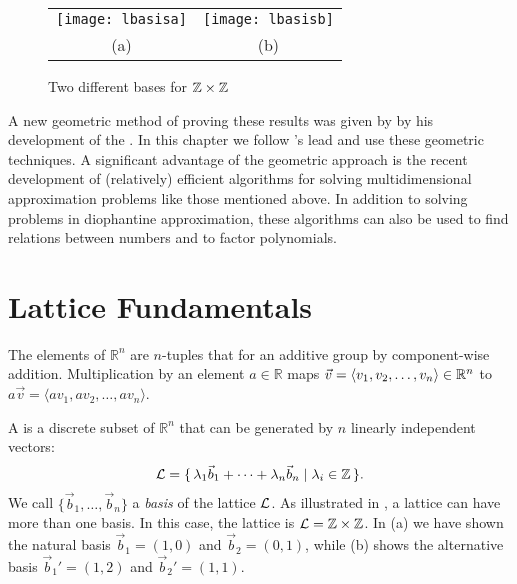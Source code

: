 \begin{figure}
\begin{center}\tabcolsep=2pc
 \begin{tabular}{cc}
  \texttt{[image: lbasisa]} 
   &
  \texttt{[image: lbasisb]} \\
  (a) & (b)
 \end{tabular}
\end{center}
\caption{Two different bases for ${\protect\mathbb{Z}} \times {\protect\mathbb{Z}}$
     \label{Lattice:Basis:Fig}}
\end{figure}

A new geometric method of proving these results was given by {\Minkowski}
by his development of the .  In this chapter
we follow {\Minkowski}'s lead and use these geometric techniques.  A
significant advantage of the geometric approach is the recent
development of (relatively) efficient algorithms for solving
multidimensional approximation problems like those mentioned above.
In addition to solving problems in diophantine approximation, these
algorithms can also be used to find relations between numbers and to
factor polynomials. 

\section{Lattice Fundamentals}
\label{Lattice:Fund:Sec}

The elements of $\mathbb{R}^{n}$ are $n$-tuples that for an additive group by 
component-wise addition. Multiplication by an element $a \in \mathbb{R}$ 
maps $\vec v = \langle v_1, v_2, \ldots, v_n \rangle \in \mathbb{R}^n$ to 
$a \vec v = \langle av_1, av_2, \ldots, a v_n \rangle$.

A  is a discrete subset of $\mathbb{R}^{n}$ that 
can be generated by $n$ linearly independent vectors: 
\begin{equation*}
{\cal L} = \{\, \lambda_{1} \vec b_{1} + \cdots + \lambda_{n} \vec b_{n} \mid
\lambda_{i} \in \mathbb{Z} \,\}.
\end{equation*}
We call $\{\vec b_{1}, \ldots, \vec b_{n}\}$ a {\em
basis} of the lattice ${\cal L}$.  As illustrated
in , a lattice can have more than one basis.
In this case, the lattice is ${\cal L} = \mathbb{Z} \times \mathbb{Z}$.  In
(a) we have shown the natural basis $\vec b_{1} =
(1, 0)$ and $\vec b_{2} = (0, 1)$, while (b)
shows the alternative basis $\vec b_{1}' = (1, 2)$ and $\vec b_{2}' = (1, 1)$.
 
